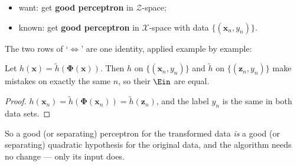 \begin{center}
\end{center}

\begin{itemize}
    \item want: get \textbf{good perceptron} in \(\mathcal{Z}\)-space;
    \item known: get \textbf{good perceptron} in \(\mathcal{X}\)-space with data
        \(\{(\bm{x}_n, y_n)\}\).
\end{itemize}

The two rows of `\(\iff\)' are one identity, applied example by example:

\begin{lemma}\label{lem:same-ein-z}
    Let \(h(\bm{x}) = \tilde{h}(\bm{\Phi}(\bm{x}))\). Then \(h\) on
    \(\{(\bm{x}_n, y_n)\}\) and \(\tilde{h}\) on \(\{(\bm{z}_n, y_n)\}\) make
    mistakes on exactly the same \(n\), so their \(\Ein\) are equal.
\end{lemma}

\begin{proof}
    \(h(\bm{x}_n) = \tilde{h}(\bm{\Phi}(\bm{x}_n)) = \tilde{h}(\bm{z}_n)\), and
    the label \(y_n\) is the same in both data sets.
\end{proof}

So a good (or separating) perceptron for the transformed data \emph{is} a good
(or separating) quadratic hypothesis for the original data, and the algorithm
needs no change --- only its input does.

